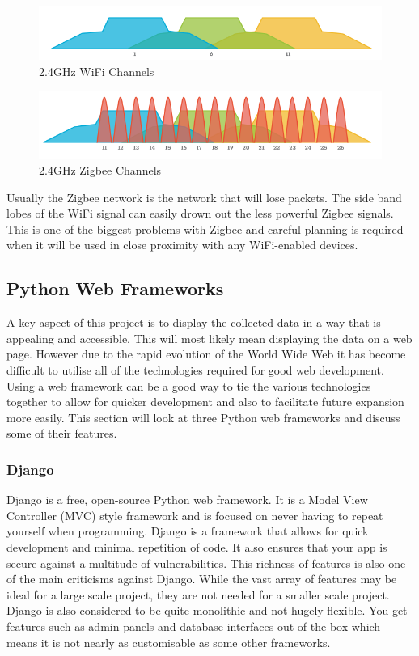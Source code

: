\documentclass[10pt,a4paper]{article}
\begin{document}
\begin{figure}[H]
\centering
  \includegraphics[width=\linewidth]{images/wifi_channels.png}
  \caption{2.4GHz WiFi Channels\cite{zigbeechannels}}
  \label{fig:wifichannels}
\end{figure}

\begin{figure}[H]
\centering
  \includegraphics[width=\linewidth]{images/zigbee_channels.png}
  \caption{2.4GHz Zigbee Channels\cite{zigbeechannels}}
  \label{fig:zigbeechannels}
\end{figure}

Usually the Zigbee network is the network that will lose packets. The side band lobes of the WiFi signal can easily drown out the less powerful Zigbee signals. This is one of the biggest problems with Zigbee and careful planning is required when it will be used in close proximity with any WiFi-enabled devices.

\subsection{Python Web Frameworks}
A key aspect of this project is to display the collected data in a way that is appealing and accessible. This will most likely mean displaying the data on a web page. However due to the rapid evolution of the World Wide Web it has become difficult to utilise all of the technologies required for good web development\cite{pop_altar_2014}. Using a web framework can be a good way to tie the various technologies together to allow for quicker development and also to facilitate future expansion more easily. This section will look at three Python web frameworks and discuss some of their features. 
\subsubsection{Django}
Django\cite{website:django} is a free, open-source Python web framework. It is a Model View Controller (MVC) style framework and is focused on never having to repeat yourself when programming. Django is a framework that allows for quick development and minimal repetition of code. It also ensures that your app is secure against a multitude of vulnerabilities. This richness of features is also one of the main criticisms against Django. While the vast array of features may be ideal for a large scale project, they are not needed for a smaller scale project. Django is also considered to be quite monolithic and not hugely flexible. You get features such as admin panels and database interfaces out of the box which means it is not nearly as customisable as some other frameworks. 
\end{document}
